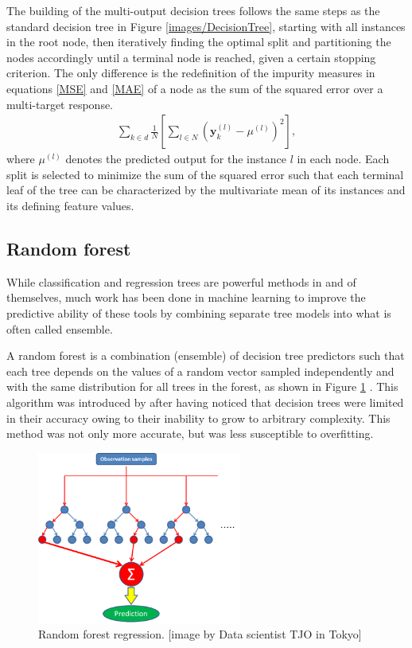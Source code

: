 The building of the multi-output decision trees follows  the same steps as the standard decision tree in Figure \ref{images/DecisionTree}, starting with all instances in the root node, then iteratively finding the optimal split and partitioning the nodes accordingly until a terminal node is reached, given a certain stopping criterion. The only difference  is the redefinition of the impurity measures in equations \ref{MSE} and \ref{MAE} of a node as the sum of the squared error  over a multi-target response. 
\begin{align}
\sum_{k\in d}\frac{1}{N}\left[\sum_{l \in N }\left(\textbf{y}_{k}^{(l)}-\mu^{(l)} \right)^2\right],
\end{align}
where $\mu^{(l)}$ denotes the predicted output for the instance $l$ in each node. Each split is selected to minimize the sum of the squared error such that each terminal leaf of the tree can be characterized by the multivariate mean
of its instances and its defining feature values.

\subsection{Random forest}
While classification and regression trees are powerful methods in and of themselves, much work has been done in machine learning to improve the predictive ability of these tools by combining separate tree models into what is often called ensemble.

A random forest is a combination (ensemble) of decision tree predictors such that each tree depends on the values of a random vector sampled independently and with the same distribution for all trees in the forest, as shown in Figure \ref{random tree} \citep{breiman2001random}. This algorithm  was introduced by \citep{ho1995random} after having noticed that decision trees were limited in their accuracy owing to their inability to grow to arbitrary complexity. This method was not only more accurate, but was less susceptible to overfitting.

 \begin{figure}[H]
  \centering
    \includegraphics[width=0.6\textwidth]{images/RandomForestTree.png}
    \caption{Random forest regression. [image by Data scientist TJO in Tokyo]}
  \label{random tree}
\end{figure}

